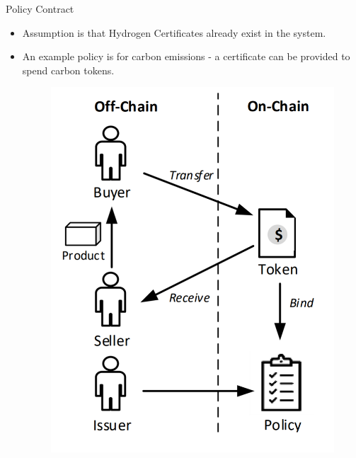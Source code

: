 \begin{frame}{Policy Contract}
    \begin{itemize}
        \item Assumption is that Hydrogen Certificates already exist in the
              system.
        \item An example policy is for carbon emissions - a certificate can be
              provided to spend carbon tokens.
              \begin{figure}
                  \includegraphics[height=0.4\textheight, width=\linewidth,
                      keepaspectratio]{photos/policy.png}
                  \centering
              \end{figure}
    \end{itemize}
\end{frame}
